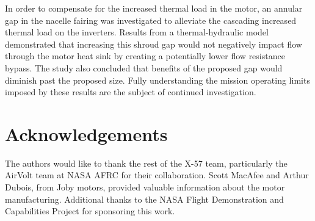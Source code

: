 \documentclass[]{aiaa-tc}%
\begin{document}
In order to compensate for the increased thermal load in the motor, an annular gap in the nacelle fairing was investigated to alleviate the cascading increased thermal load on the inverters. Results from a thermal-hydraulic model demonstrated that increasing this shroud gap would not negatively impact flow through the motor heat sink by creating a potentially lower flow resistance bypass. The study also concluded that benefits of the proposed gap would diminish past the proposed size. Fully understanding the mission operating limits imposed by these results are the subject of continued investigation.

\section{Acknowledgements}

The authors would like to thank the rest of the X-57 team, particularly the AirVolt team at NASA AFRC for their collaboration. Scott MacAfee and Arthur Dubois, from Joby motors, provided valuable information about the motor manufacturing. Additional thanks to the NASA Flight Demonstration and Capabilities Project for sponsoring this work.




\end{document}
